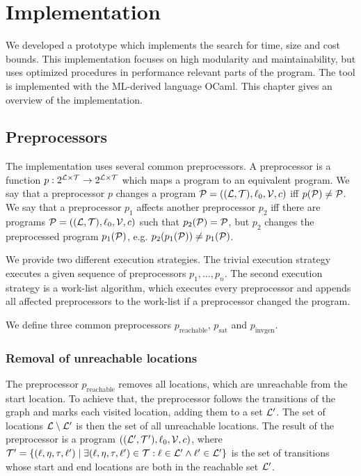\section{Implementation}

We developed a prototype which implements the search for time, size and cost bounds.
This implementation focuses on high modularity and maintainability, but uses optimized procedures in performance relevant parts of the program.
The tool is implemented with the ML-derived language OCaml.
This chapter gives an overview of the implementation.

\subsection{Preprocessors}

The implementation uses several common preprocessors.
A preprocessor is a function $p: 2^{\mathcal{L} \times \mathcal{T}} \rightarrow 2^{\mathcal{L} \times \mathcal{T}}$ which maps a program to an equivalent program.
We say that a preprocessor $p$ changes a program $\mathcal{P} = ((\mathcal{L}, \mathcal{T}), \ell_0, \mathcal{V}, c)$ iff $p(\mathcal{P}) \neq \mathcal{P}$.
We say that a preprocessor $p_1$ affects another preprocessor $p_2$ iff there are programs $\mathcal{P} = ((\mathcal{L}, \mathcal{T}), \ell_0, \mathcal{V}, c)$ such that $p_2(\mathcal{P}) = \mathcal{P}$, but $p_2$ changes the preprocessed program $p_1(\mathcal{P})$, e.g. $p_2(p_1(\mathcal{P})) \neq p_1(\mathcal{P})$.

We provide two different execution strategies.
The trivial execution strategy executes a given sequence of preprocessors $p_1, \dots, p_n$.
The second execution strategy is a work-list algorithm, which executes every preprocessor and appends all affected preprocessors to the work-list if a preprocessor changed the program.

We define three common preprocessors $p_{\text{reachable}}$, $p_{\text{sat}}$ and $p_{\text{invgen}}$.

\subsubsection{Removal of unreachable locations}

The preprocessor $p_{\text{reachable}}$ removes all locations, which are unreachable from the start location.
To achieve that, the preprocessor follows the transitions of the graph and marks each visited location, adding them to a set $\mathcal{L}'$.
The set of locations $\mathcal{L} \setminus \mathcal{L}'$ is then the set of all unreachable locations.
The result of the preprocessor is a program $((\mathcal{L}', \mathcal{T}'), \ell_0, \mathcal{V}, c)$, where $\mathcal{T}' = \lbrace (\ell,\eta,\tau,\ell') \mid \exists (\ell,\eta,\tau,\ell') \in \mathcal{T}: \ell \in \mathcal{L}' \wedge \ell' \in \mathcal{L}' \rbrace$ is the set of transitions whose start and end locations are both in the reachable set $\mathcal{L}'$.

